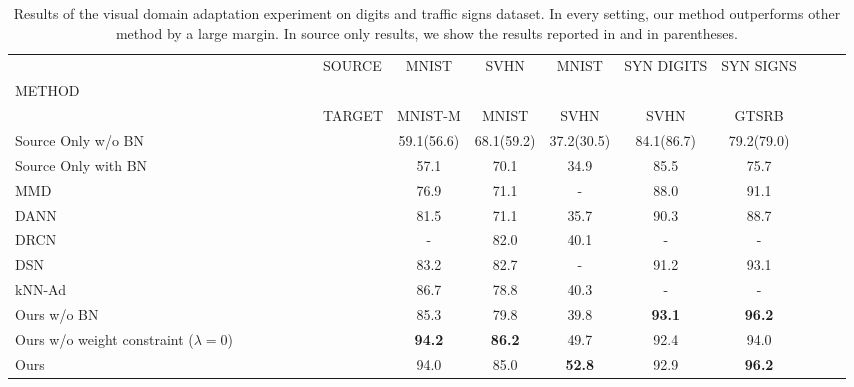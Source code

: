 \documentclass{article}
\begin{document}
\begin{table*}[t]
\begin{center}
\begin{tabular}{l|cccccccc}
\toprule
\ \ \ \ \ \ \ \ \ \ \ \ \ \ \ \ \ \ \ \ \ \ \ \ \ \ \ \ \ \ \ \ \ \ \ \ \ \ \ \ \ \ \ \ SOURCE & MNIST & SVHN &MNIST&SYN DIGITS&SYN SIGNS\\ 
METHOD&&&&&\\
\ \ \ \ \ \ \ \ \ \ \ \ \ \ \ \ \ \ \ \ \ \ \ \ \ \ \ \ \ \ \ \ \ \ \ \ \ \ \ \ \ \ \ \ TARGET & MNIST-M&MNIST &SVHN&SVHN&GTSRB\\ \midrule
Source Only w/o BN&59.1(56.6)&68.1(59.2)&37.2(30.5)&84.1(86.7)&79.2(79.0)\\
Source Only with BN&57.1&70.1&34.9&85.5&75.7\\\hline
MMD \cite{long2015learning}&76.9&71.1&-&88.0&91.1\\
DANN \cite{ganin2014unsupervised}&81.5&71.1&35.7&90.3&88.7\\
DRCN \cite{ghifary2016deep}&-&82.0&40.1&-&-\\
DSN \cite{bousmalis2016domain}&83.2&82.7&-&91.2&93.1\\
kNN-Ad \cite{sener2016learning}&86.7&78.8&40.3&-&-\\\midrule
Ours w/o BN&{85.3}&79.8&39.8&{\bf 93.1}&{\bf 96.2}\\
Ours w/o weight constraint ($\lambda = 0$)&{\bf 94.2}&{\bf 86.2}&49.7&92.4&94.0\\
Ours &94.0&85.0&{\bf 52.8}&92.9&{\bf 96.2}\\\bottomrule
\end{tabular}
\caption{Results of the visual domain adaptation experiment on digits and traffic signs dataset. In every setting, our method outperforms other method by a large margin. In source only results, we show the results reported in \cite{bousmalis2016domain} and \cite{ghifary2016deep} in parentheses.} 
\label{table:exp_scratch}
\end{center}
\end{table*}
\end{document}
